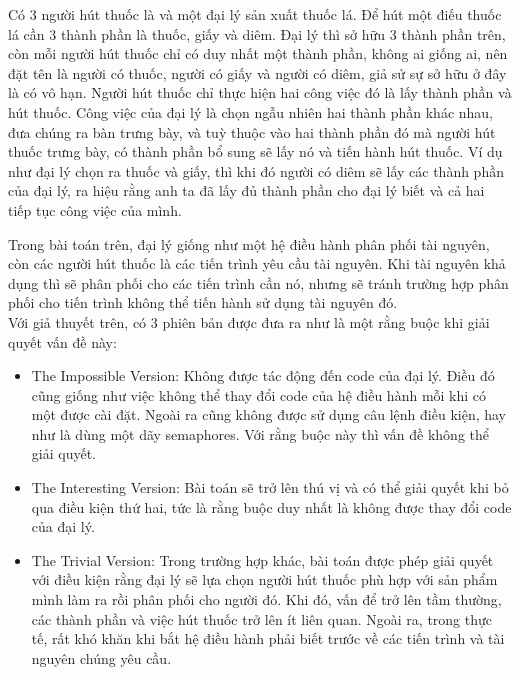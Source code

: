 \documentclass[a4paper]{article}
\begin{document}
	
	\begin{tcolorbox}
		Có 3 người hút thuốc là và một đại lý sản xuất thuốc lá. Để hút một điếu thuốc lá cần 3 thành 
		phần là thuốc, giấy và diêm. Đại lý thì sở hữu 3 thành phần trên, còn mỗi người hút thuốc
		chỉ có duy nhất một thành phần, không ai giống ai, nên đặt tên là người có thuốc, người có giấy
		và người có diêm, giả sử sự sở hữu ở đây là có vô hạn. Người hút thuốc chỉ thực hiện hai công
		việc đó là lấy thành phần và hút thuốc. Công việc của đại lý là chọn ngẫu nhiên hai thành phần 
		khác nhau, đưa chúng ra bàn trưng bày, và tuỳ thuộc vào hai thành phần đó mà người hút thuốc trưng bày,
		có thành phần bổ sung sẽ lấy nó
		và tiến hành hút thuốc. Ví dụ như đại lý chọn ra thuốc và giấy, thì khi đó người có diêm sẽ lấy 
		các thành phần của đại lý, ra hiệu rằng anh ta đã lấy đủ thành phần cho đại lý biết và cả hai tiếp
		tục công việc của mình.
	\end{tcolorbox}

	Trong bài toán trên, đại lý giống như một hệ điều hành phân phối tài nguyên, còn các người hút thuốc
	là các tiến trình yêu cầu tài nguyên. Khi tài nguyên khả dụng thì sẽ phân phối cho các tiến trình cần
	nó, nhưng sẽ tránh trường hợp phân phối cho tiến trình không thể tiến hành sử dụng tài nguyên đó. \\
	Với giả thuyết trên, có 3 phiên bản được đưa ra như là một rằng buộc khi giải quyết vấn đề này:

	\begin{itemize}
		\item The Impossible Version: Không được tác động đến code của đại lý. Điều đó cũng 
		giống như việc không thể thay đổi code của hệ điều hành mỗi khi có một được cài đặt. Ngoài ra
		cũng không được sử dụng câu lệnh điều kiện, hay như là dùng một dãy semaphores.  
		Với rằng buộc này thì vấn đề không thể giải quyết. 
		\item The Interesting Version: Bài toán sẽ trở lên thú vị và có thể giải quyết khi
		bỏ qua điều kiện thứ hai, tức là rằng buộc duy nhất là không được thay đổi code của đại lý.
		\item The Trivial Version: Trong trường hợp khác, bài toán được phép giải quyết với
		điều kiện rằng đại lý sẽ lựa chọn người hút thuốc phù hợp với sản phẩm mình làm ra rồi phân 
		phối cho người đó. Khi đó, vấn để trở lên tầm thường, các thành phần và việc hút thuốc trở 
		lên ít liên quan. Ngoài ra, trong thực tế, rất khó khăn khi bắt hệ điều hành phải biết trước
		về các tiến trình và tài nguyên chúng yêu cầu. 
	\end{itemize}
\end{document}
